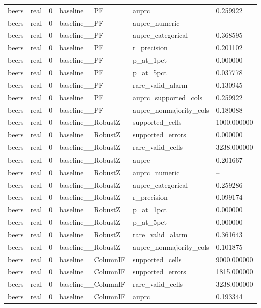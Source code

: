\begin{tabular}{llllll}
beers & real & 0 & baseline\_\_PF & auprc & 0.259922 \\
beers & real & 0 & baseline\_\_PF & auprc\_numeric & -- \\
beers & real & 0 & baseline\_\_PF & auprc\_categorical & 0.368595 \\
beers & real & 0 & baseline\_\_PF & r\_precision & 0.201102 \\
beers & real & 0 & baseline\_\_PF & p\_at\_1pct & 0.000000 \\
beers & real & 0 & baseline\_\_PF & p\_at\_5pct & 0.037778 \\
beers & real & 0 & baseline\_\_PF & rare\_valid\_alarm & 0.130945 \\
beers & real & 0 & baseline\_\_PF & auprc\_supported\_cols & 0.259922 \\
beers & real & 0 & baseline\_\_PF & auprc\_nonmajority\_cols & 0.180088 \\
beers & real & 0 & baseline\_\_RobustZ & supported\_cells & 1000.000000 \\
beers & real & 0 & baseline\_\_RobustZ & supported\_errors & 0.000000 \\
beers & real & 0 & baseline\_\_RobustZ & rare\_valid\_cells & 3238.000000 \\
beers & real & 0 & baseline\_\_RobustZ & auprc & 0.201667 \\
beers & real & 0 & baseline\_\_RobustZ & auprc\_numeric & -- \\
beers & real & 0 & baseline\_\_RobustZ & auprc\_categorical & 0.259286 \\
beers & real & 0 & baseline\_\_RobustZ & r\_precision & 0.099174 \\
beers & real & 0 & baseline\_\_RobustZ & p\_at\_1pct & 0.000000 \\
beers & real & 0 & baseline\_\_RobustZ & p\_at\_5pct & 0.000000 \\
beers & real & 0 & baseline\_\_RobustZ & rare\_valid\_alarm & 0.361643 \\
beers & real & 0 & baseline\_\_RobustZ & auprc\_nonmajority\_cols & 0.101875 \\
beers & real & 0 & baseline\_\_ColumnIF & supported\_cells & 9000.000000 \\
beers & real & 0 & baseline\_\_ColumnIF & supported\_errors & 1815.000000 \\
beers & real & 0 & baseline\_\_ColumnIF & rare\_valid\_cells & 3238.000000 \\
beers & real & 0 & baseline\_\_ColumnIF & auprc & 0.193344 \\

\end{tabular}
